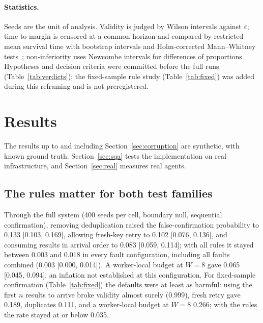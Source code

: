 \documentclass[11pt]{article}
\theoremstyle{definition}
\begin{document}
\paragraph{Statistics.} Seeds are the unit of analysis. Validity is judged by Wilson intervals against $\varepsilon$; time-to-margin is censored at a common horizon and compared by restricted mean survival time with bootstrap intervals and Holm-corrected Mann--Whitney tests~\cite{kaplan1958}; non-inferiority uses Newcombe intervals for differences of proportions. Hypotheses and decision criteria were committed before the full runs (Table~\ref{tab:verdicts}); the fixed-sample rule study (Table~\ref{tab:fixed}) was added during this reframing and is not preregistered.

\section{Results}\label{sec:results}
The results up to and including Section~\ref{sec:corruption} are synthetic, with known ground truth. Section~\ref{sec:sqa} tests the implementation on real infrastructure, and Section~\ref{sec:real} measures real agents.

\subsection{The rules matter for both test families}
Through the full system (400 seeds per cell, boundary null, sequential confirmation), removing deduplication raised the false-confirmation probability to 0.133 [0.103, 0.169], allowing fresh-key retry to 0.102 [0.076, 0.136], and consuming results in arrival order to 0.083 [0.059, 0.114]; with all rules it stayed between 0.003 and 0.018 in every fault configuration, including all faults combined (0.003 [0.000, 0.014]). A worker-local budget at $W=8$ gave 0.065 [0.045, 0.094], an inflation not established at this configuration. For fixed-sample confirmation (Table~\ref{tab:fixed}) the defaults were at least as harmful: using the first $n$ results to arrive broke validity almost surely (0.999), fresh retry gave 0.189, duplicates 0.111, and a worker-local budget at $W=8$ 0.266; with the rules the rate stayed at or below 0.035.
\end{document}
